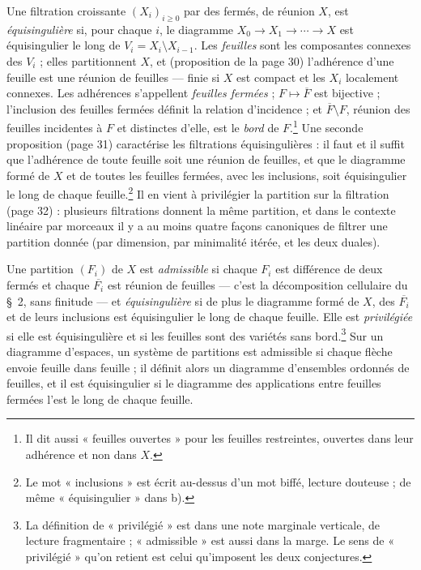 \documentclass[11pt,a4paper]{article}
\begin{document}
Une filtration croissante $(X_i)_{i \geqslant 0}$ par des fermés, de réunion
$X$, est \emph{équisingulière} si, pour chaque $i$, le diagramme
$X_0 \to X_1 \to \cdots \to X$ est équisingulier le long de $V_i = X_i
\setminus X_{i-1}$. Les \emph{feuilles} sont les composantes connexes des
$V_i$ ; elles partitionnent $X$, et (proposition de la page 30) l'adhérence
d'une feuille est une réunion de feuilles — finie si $X$ est compact et les
$X_i$ localement connexes. Les adhérences s'appellent \emph{feuilles fermées} ;
$F \mapsto \overline{F}$ est bijective ; l'inclusion des feuilles fermées
définit la relation d'incidence ; et $\overline{F} \setminus F$, réunion des
feuilles incidentes à $F$ et distinctes d'elle, est le \emph{bord} de
$F$.\footnote{Il dit aussi « feuilles ouvertes » pour les feuilles
restreintes, ouvertes dans leur adhérence et non dans $X$.} Une seconde
proposition (page 31) caractérise les filtrations équisingulières : il faut et
il suffit que l'adhérence de toute feuille soit une réunion de feuilles, et que
le diagramme formé de $X$ et de toutes les feuilles fermées, avec les
inclusions, soit équisingulier le long de chaque feuille.\footnote{Le mot
« inclusions » est écrit au-dessus d'un mot biffé, lecture douteuse ; de même
« équisingulier » dans b).} Il en vient à
privilégier la partition sur la filtration (page 32) : plusieurs filtrations
donnent la même partition, et dans le contexte linéaire par morceaux il y a au
moins quatre façons canoniques de filtrer une partition donnée (par dimension,
par minimalité itérée, et les deux duales).

Une partition $(F_i)$ de $X$ est \emph{admissible} si chaque $F_i$ est
différence de deux fermés et chaque $\overline{F_i}$ est réunion de feuilles —
c'est la décomposition cellulaire du §~2, sans finitude — et
\emph{équisingulière} si de plus le diagramme formé de $X$, des
$\overline{F_i}$ et de leurs inclusions est équisingulier le long de chaque
feuille. Elle est \emph{privilégiée} si elle est équisingulière et si les
feuilles sont des variétés sans bord.\footnote{La définition de « privilégié »
est dans une note marginale verticale, de lecture fragmentaire ; « admissible »
est aussi dans la marge. Le sens de « privilégié » qu'on retient est celui
qu'imposent les deux conjectures.} Sur un diagramme d'espaces, un système de
partitions est admissible si chaque flèche envoie feuille dans feuille ; il
définit alors un diagramme d'ensembles ordonnés de feuilles, et il est
équisingulier si le diagramme des applications entre feuilles fermées l'est le
long de chaque feuille.
\end{document}

